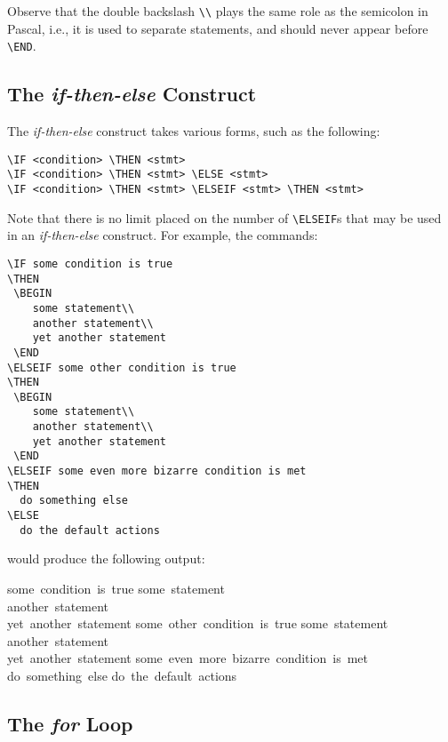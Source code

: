 \documentclass{article}
\begin{document}
Observe that the double backslash \verb+\\+ plays the same
role as the semicolon in Pascal, i.e., it is used to
separate statements, and should never appear before
\verb+\END+.

\subsection{The {\em if-then-else} Construct}

The {\em if-then-else} construct takes various forms,
such as the following:
\begin{verbatim}
\IF <condition> \THEN <stmt> 
\IF <condition> \THEN <stmt> \ELSE <stmt> 
\IF <condition> \THEN <stmt> \ELSEIF <stmt> \THEN <stmt> 
\end{verbatim}
Note that there is no limit placed on the number
of \verb+\ELSEIF+s that may be used in an {\em if-then-else} construct.
For example,  the commands:
\begin{verbatim}
\IF some condition is true
\THEN
 \BEGIN
    some statement\\
    another statement\\
    yet another statement
 \END
\ELSEIF some other condition is true
\THEN
 \BEGIN
    some statement\\
    another statement\\
    yet another statement
 \END
\ELSEIF some even more bizarre condition is met
\THEN 
  do something else
\ELSE
  do the default actions
\end{verbatim}

\noindent{}would produce the following output:

\medskip
\begin{pseudocode}[display]{}{}
\IF \mbox{some condition is true}
\THEN 
\BEGIN
\mbox{some statement}\\
\mbox{another statement}\\
\mbox{yet another statement}
\END
\ELSEIF \mbox{some other condition is true}
\THEN 
\BEGIN
\mbox{some statement}\\
\mbox{another statement}\\
\mbox{yet another statement}
\END
\ELSEIF\mbox{some even more bizarre condition is met}
\THEN \mbox{do something else}
\ELSE
\mbox{do the default actions}
\end{pseudocode}

\subsection{The {\em for} Loop}
\end{document}
